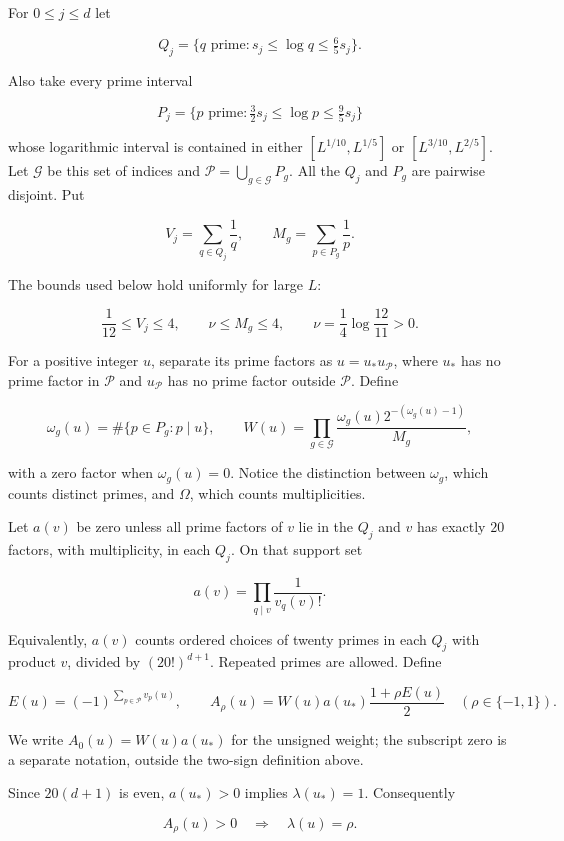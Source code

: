 For \(0\le j\le d\) let

\[
Q_j=\{q\text{ prime}:s_j\le\log q\le\tfrac65s_j\}.
\]

Also take every prime interval

\[
P_j=\{p\text{ prime}:\tfrac32s_j\le\log p\le\tfrac95s_j\}
\]

whose logarithmic interval is contained in either \([L^{1/10},L^{1/5}]\)
or \([L^{3/10},L^{2/5}]\). Let \(\mathcal G\) be this set of indices and
\(\mathcal P=\bigcup_{g\in\mathcal G}P_g\). All the \(Q_j\) and \(P_g\)
are pairwise disjoint. Put

\[
V_j=\sum_{q\in Q_j}\frac1q,\qquad M_g=\sum_{p\in P_g}\frac1p.
\]

The bounds used below hold uniformly for large \(L\):

\[
\frac1{12}\le V_j\le4,\qquad
\nu\le M_g\le4,\qquad \nu=\frac14\log\frac{12}{11}>0.
\]

For a positive integer \(u\), separate its prime factors as
\(u=u_*u_{\mathcal P}\), where \(u_*\) has no prime factor in
\(\mathcal P\) and \(u_{\mathcal P}\) has no prime factor outside
\(\mathcal P\). Define

\[
\omega_g(u)=\#\{p\in P_g:p\mid u\},\qquad
W(u)=\prod_{g\in\mathcal G}
       \frac{\omega_g(u)2^{-(\omega_g(u)-1)}}{M_g},
\]

with a zero factor when \(\omega_g(u)=0\). Notice the distinction
between \(\omega_g\), which counts distinct primes, and \(\Omega\),
which counts multiplicities.

Let \(a(v)\) be zero unless all prime factors of \(v\) lie in the
\(Q_j\) and \(v\) has exactly \(20\) factors, with multiplicity, in each
\(Q_j\). On that support set

\[
a(v)=\prod_{q\mid v}\frac1{v_q(v)!}.
\]

Equivalently, \(a(v)\) counts ordered choices of twenty primes in each
\(Q_j\) with product \(v\), divided by \((20!)^{d+1}\). Repeated primes
are allowed. Define

\[
E(u)=(-1)^{\sum_{p\in\mathcal P}v_p(u)},\qquad
A_\rho(u)=W(u)a(u_*)\frac{1+\rho E(u)}2
\quad(\rho\in\{-1,1\}).
\]

We write \(A_0(u)=W(u)a(u_*)\) for the unsigned weight; the subscript
zero is a separate notation, outside the two-sign definition above.

Since \(20(d+1)\) is even, \(a(u_*)>0\) implies \(\lambda(u_*)=1\).
Consequently

\[
A_\rho(u)>0\quad\Longrightarrow\quad\lambda(u)=\rho. \tag{1}
\]

